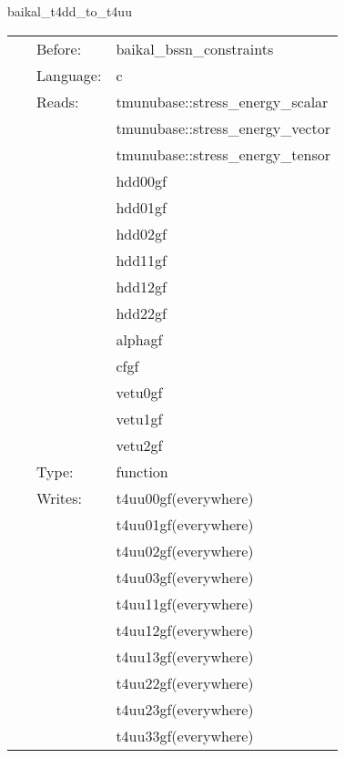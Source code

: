 
\hspace{5mm} baikal\_t4dd\_to\_t4uu 

\hspace{5mm}{\it compute t4uu from t4dd (provided in et?? from tmunubase), needed for bssn constraints } 


\hspace{5mm}

 \begin{tabular*}{160mm}{cll} 
~ & Before:  & baikal\_bssn\_constraints \\ 
~ & Language:  & c \\ 
~ & Reads:  & tmunubase::stress\_energy\_scalar \\ 
~& ~ &tmunubase::stress\_energy\_vector\\ 
~& ~ &tmunubase::stress\_energy\_tensor\\ 
~& ~ &hdd00gf\\ 
~& ~ &hdd01gf\\ 
~& ~ &hdd02gf\\ 
~& ~ &hdd11gf\\ 
~& ~ &hdd12gf\\ 
~& ~ &hdd22gf\\ 
~& ~ &alphagf\\ 
~& ~ &cfgf\\ 
~& ~ &vetu0gf\\ 
~& ~ &vetu1gf\\ 
~& ~ &vetu2gf\\ 
~ & Type:  & function \\ 
~ & Writes:  & t4uu00gf(everywhere) \\ 
~& ~ &t4uu01gf(everywhere)\\ 
~& ~ &t4uu02gf(everywhere)\\ 
~& ~ &t4uu03gf(everywhere)\\ 
~& ~ &t4uu11gf(everywhere)\\ 
~& ~ &t4uu12gf(everywhere)\\ 
~& ~ &t4uu13gf(everywhere)\\ 
~& ~ &t4uu22gf(everywhere)\\ 
~& ~ &t4uu23gf(everywhere)\\ 
~& ~ &t4uu33gf(everywhere)\\ 
\end{tabular*} 


\vspace{5mm}


